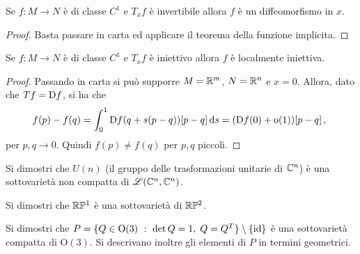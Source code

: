 \begin{proposition}
	Se $f:M\to N$ è di classe $C^1$ e $T_xf$ è invertibile allora $f$ è un diffeomorfismo in $x$.
\end{proposition}

 \begin{proof}
  Basta passare in carta ed applicare il teorema della funzione implicita.
 \end{proof}

\begin{proposition}
	Se $f:M\to N$ è di classe $C^1$ e $T_xf$ è iniettivo allora $f$ è localmente iniettiva.
\end{proposition}

\begin{proof}
	Passando in carta si può supporre $M=\mathbb R^m$, $N=\mathbb R^n$ e $x=0$. Allora, dato che $Tf=\mathrm D f$, si ha che
	\begin{equation*}
	f(p)-f(q)=\int_0^1\mathrm D f(q+s(p-q))[p-q]\,\mathrm d s=(\mathrm D f(0)+\mathrm{o}(1))[p-q]\, \text{, }
	\end{equation*}
	per $p,q\to 0$. Quindi $f(p)\ne f(q)$ per $p,q$ piccoli.
\end{proof}

\begin{exercise}
	Si dimostri che $U(n)$ (il gruppo delle trasformazioni unitarie di $\mathbb C^n$) è una sottovarietà non compatta di $\mathscr L(\mathbb C^n,\mathbb C^n)$.
\end{exercise}
\begin{exercise}
	Si dimostri che $\mathbb R \mathbb P^1$ è una sottovarietà di $\mathbb R \mathbb P^2$.
\end{exercise}
\begin{exercise}
	Si dimostri che $P=\{ Q\in \mathrm O(3)\ :\ \det Q=1,\; Q=Q^T\}\setminus\{\id\}$ è una sottovarietà compatta di $\mathrm O(3)$. Si descrivano inoltre gli elementi di $P$ in termini geometrici.
\end{exercise}